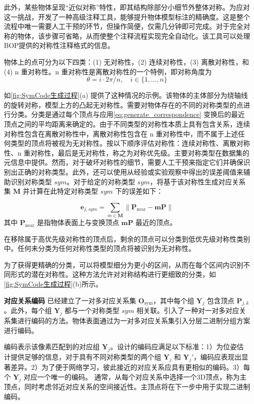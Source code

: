 此外，某些物体呈现“近似对称”特性，即其结构除部分小细节外整体对称。为应对这一挑战，开发了一种高级注释工具，能够提升物体模型标注的精确度。这是整个流程中唯一需要人工干预的环节，但操作简便，仅需几分钟即可完成。对于完全对称的物体，该步骤可省略，从而使整个注释流程实现完全自动化。该工具可以处理BOP\cite{hodan2024bop}提供的对称性注释格式的信息。

物体上的点可分为以下四类：(1) 无对称性，(2) 连续对称性，(3) 离散对称性，和 (4) n 重对称性。n 重对称性是离散对称性的一个特例，即对称角度为
\begin{equation}
\theta=i \cdot 2\pi /n,\quad i \in \{1,...,n\}
\end{equation}

如\autoref{fig:SymCode生成过程}(a) 提供了这种情况的示例。该物体的主体部分为绕轴线的旋转对称，模型上方的凸起无对称性。需要对物体存在的不同的对称类型的点进行分类。分类是通过每个顶点与应用\autoref{eq:generate_correspondence} 变换后的最近顶点之间的平均距离来确定的。由于不同类型的对称性本质上具有包含关系，连续对称性包含在离散对称性中，离散对称性包含在 n 重对称性中，而不属于上述任何类型的顶点将被视为无对称性。按以下顺序评估对称性：连续对称性、离散对称性、n 重对称性，最后是无对称性，称之为对称优先级。主要对称类型在数据集的元信息中提供。然而，对于破坏对称性的细节，需要人工干预来指定它们并确保识别出正确的对称类型。此外，还可以使用从经验或实验观察中得出的误差阈值来辅助识别对称类型 $sym$。对于给定的对称类型 $sym$，将基于该对称性生成对应关系集 $\bm{M}$ 并计算在此特定对称类型 $sym$ 下的误差如下：

\begin{equation}
\bm{e}_{j,sym} = \sum_{m\in\bm{M}}\left \|  \bm{P}_{\text{near}} - \bm{m}\bm{P} \right \| 
\end{equation}
其中 $\bm{P}_{\text{near}}$ 是指物体表面上与变换顶点 $\bm{m}\bm{P}$ 最近的顶点。

在移除属于高优先级对称性的顶点后，剩余的顶点可以分类到低优先级对称性类别中。任何未分类为任何对称性类型的顶点将被识别为无对称性。

为了获得更精确的分类，可以将模型细分为更小的区间，从而在每个区间内识别不同形式的潜在对称性。这种方法允许对对称结构进行更细致的分类，如\autoref{fig:SymCode生成过程}(b)所示。

\textbf{对应关系编码 } 已经建立了一对多对应关系集 $\bm{O}_\text{sym}$，其中每个组 $\bm{Y}_j$ 包含顶点 $\bm{P}_{j,k}$。此外，每个组 $\bm{Y}_j$ 都与一个对称类型 $sym$ 相关联。引入了一种对一对多对应关系集进行编码的方法。物体表面通过为一对多对应关系集引入分层二进制分组方案进行编码。

编码表示该像素匹配到的对应组 $\bm{Y}_j$。设计的编码应满足以下标准：1）为位姿估计提供足够的信息，对于具有不同对称类型的两个组 $\bm{Y}_j$ 和 $\bm{Y}_j'$，编码应表现出显著差异。2）为了便于网络学习，彼此接近的对应关系应具有更相似的编码。3）每个 $\bm{Y}_j$ 对应一个唯一的编码。
通常，从每个对应关系中选择一个3D顶点，称为主顶点，同时考虑邻近对应关系的空间接近性。主顶点将在下一步中用于实现二进制编码。

